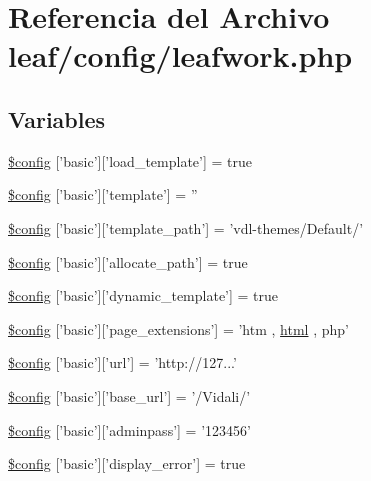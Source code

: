\hypertarget{config_2leafwork_8php}{\section{Referencia del Archivo leaf/config/leafwork.php}
\label{config_2leafwork_8php}
}
\subsection*{Variables}
\begin{DoxyCompactItemize}
\item 
\hyperlink{config_2leafwork_8php_a075b975d77f5da88d2feb10378a147c5}{\$config} \mbox{[}'basic'\mbox{]}\mbox{[}'load\-\_\-template'\mbox{]} = true
\item 
\hyperlink{config_2leafwork_8php_a07f27d8d23db662a791185cdfda107c6}{\$config} \mbox{[}'basic'\mbox{]}\mbox{[}'template'\mbox{]} = ''
\item 
\hyperlink{config_2leafwork_8php_acf8244dece93624571d1c2dd72002bae}{\$config} \mbox{[}'basic'\mbox{]}\mbox{[}'template\-\_\-path'\mbox{]} = 'vdl-\/themes/Default/'
\item 
\hyperlink{config_2leafwork_8php_ad09db026139844b4edfe9943623f462b}{\$config} \mbox{[}'basic'\mbox{]}\mbox{[}'allocate\-\_\-path'\mbox{]} = true
\item 
\hyperlink{config_2leafwork_8php_a264786660a8c9560ccaefade1ac3d3a9}{\$config} \mbox{[}'basic'\mbox{]}\mbox{[}'dynamic\-\_\-template'\mbox{]} = true
\item 
\hyperlink{config_2leafwork_8php_aac461bcedf0fc8f78267555706c7f3e9}{\$config} \mbox{[}'basic'\mbox{]}\mbox{[}'page\-\_\-extensions'\mbox{]} = 'htm , \hyperlink{classhtml}{html} , php'
\item 
\hyperlink{config_2leafwork_8php_acfa968ff50363c1152f99b10cbad5fc6}{\$config} \mbox{[}'basic'\mbox{]}\mbox{[}'url'\mbox{]} = 'http\-://127...'
\item 
\hyperlink{config_2leafwork_8php_a03edb65478a44cb182c5c47a28e89e90}{\$config} \mbox{[}'basic'\mbox{]}\mbox{[}'base\-\_\-url'\mbox{]} = '/Vidali/'
\item 
\hyperlink{config_2leafwork_8php_ada49f44ebb25c291c5607ec0d272cea5}{\$config} \mbox{[}'basic'\mbox{]}\mbox{[}'adminpass'\mbox{]} = '123456'
\item 
\hyperlink{config_2leafwork_8php_a8676578f6f768608f5d7ab8dc1db6f08}{\$config} \mbox{[}'basic'\mbox{]}\mbox{[}'display\-\_\-error'\mbox{]} = true
\item 

\end{DoxyCompactItemize}
